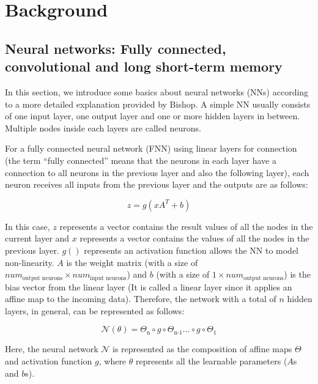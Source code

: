 \chapter{Background}\label{chap:background}


\section{Neural networks: Fully connected, convolutional and long short-term memory}

In this section, we introduce some basics about neural networks (NNs) according to a more detailed explanation provided by Bishop. \citep{10.1117_1.2819119} A simple NN usually consists of one input layer, one output layer and one or more hidden layers in between. Multiple nodes inside each layers are called neurons. 

For a fully connected neural network (FNN) using linear layers for connection (the term “fully connected” means that the neurons in each layer have a connection to all neurons in the previous layer and also the following layer), each neuron receives all inputs from the previous layer and the outputs are as follows:

\begin{equation}
z = g(xA^{T} + b)
\end{equation}

In this case, $z$ represents a vector contains the result values of all the nodes in the current layer and $x$ represents a vector contains the values of all the nodes in the previous layer. $g()$ represents an activation function allows the NN to model non-linearity. $A$ is the weight matrix (with a size of $num_\text{output neurons} \times num_\text{input neurons}$) and $b$ (with a size of $1 \times num_\text{output neurons}$) is the bias vector from the linear layer (It is called a linear layer since it applies an affine map to the incoming data). Therefore, the network with a total of $n$ hidden layers, in general, can be represented as follows:

\begin{equation}
\mathcal{N}(\theta) = \Theta_\text{n} \circ g \circ \Theta_\text{n-1} ... \circ g \circ \Theta_1
\end{equation}

Here, the neural network $\mathcal{N}$ is represented as the composition of affine maps $\Theta$ and activation function $g$, where $\theta$ represents all the learnable parameters ($A$s and $b$s).

